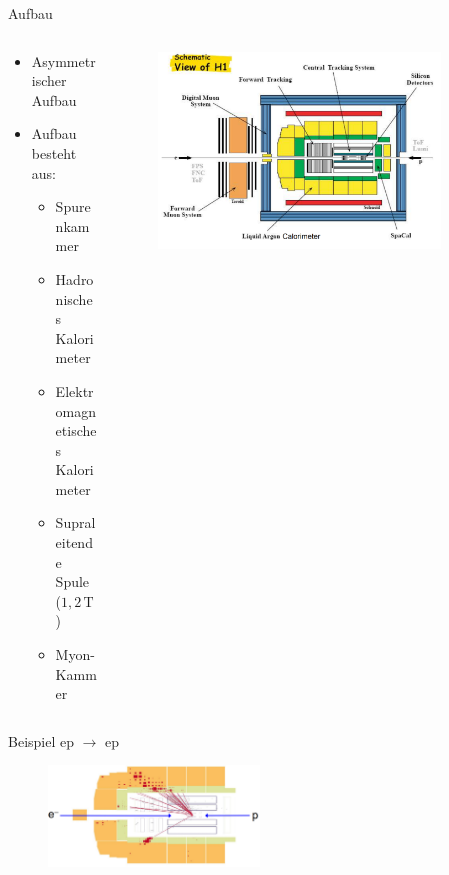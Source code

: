 \documentclass[aspectratio=1610, 9pt]{beamer}
\begin{document}
\begin{frame}{Aufbau}
  \begin{columns}
    \begin{column}{0.4\textwidth}
      \begin{itemize}
        \item{Asymmetrischer Aufbau}
        \item{Aufbau besteht aus:}
        \begin{itemize}
          \item{Spurenkammer}
          \item{Hadronisches Kalorimeter}
          \item{Elektromagnetisches Kalorimeter}
          \item{Supraleitende Spule ($1,2\,\mathrm{T} $)}
          \item{Myon-Kammer}
        \end{itemize}
      \end{itemize}
    \end{column}

    \begin{column}{0.6\textwidth}
      \begin{figure}
        \centering
        \includegraphics[width=0.9\textwidth]{images/H1.png}
      \end{figure}
    \end{column}
  \end{columns}
\end{frame}

\begin{frame}{Beispiel}
  ep $\rightarrow$ ep
  \begin{figure}
    \centering
    \includegraphics[width=0.50\textwidth]{images/ep-ep.png}
  \end{figure}
\end{frame}
\end{document}
